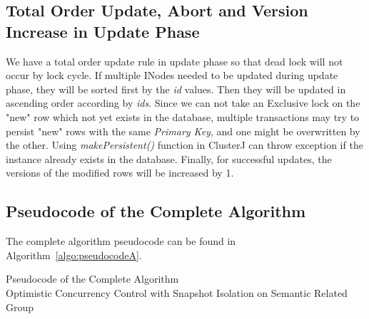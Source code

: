 \documentclass[runningheads,a4paper]{llncs}
\begin{document}
\subsection{Total Order Update, Abort and Version Increase in Update Phase}
We have a total order update rule in update phase so that dead lock will not occur by lock cycle. If multiple INodes needed to be updated during update phase, they will be sorted first by the \textit{id} values. Then they will be updated in ascending order according by \textit{ids}. Since we can not take an Exclusive lock on the "new" row which not yet exists in the database, multiple transactions may try to persist "new" rows with the same \textit{Primary Key}, and one might be overwritten by the other. Using \textit{makePersistent()} function in ClusterJ can throw exception if the instance already exists in the database. Finally, for successful updates, the versions of the modified rows will be increased by 1.
\subsection{Pseudocode of the Complete Algorithm}
The complete algorithm pseudocode can be found in Algorithm~\ref{algo:pseudocodeA}.
\begin{algorithm}[!h]
	\caption{Pseudocode of the Complete Algorithm \\ Optimistic Concurrency Control with Snapshot Isolation on Semantic Related Group}
	\label{algo:pseudocodeA}
	\begin{algorithmic}[1]
		
		\ELSE
		\ENDIF
		\ELSE
		\ENDIF
		\ENDWHILE
		
	\end{algorithmic}
\end{algorithm}
\end{document}
